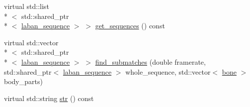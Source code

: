 \begin{DoxyCompactItemize}
\item 
virtual std\-::list\\*
$<$ std\-::shared\-\_\-ptr\\*
$<$ \hyperlink{classmae_1_1fl_1_1laban_1_1laban__sequence}{laban\-\_\-sequence} $>$ $>$ \hyperlink{classmae_1_1fl_1_1laban_1_1decision__forest_a126d3adc28394e6c59e0241236c9cabe}{get\-\_\-sequences} () const 
\item 
virtual std\-::vector\\*
$<$ std\-::shared\-\_\-ptr\\*
$<$ \hyperlink{classmae_1_1fl_1_1laban_1_1laban__sequence}{laban\-\_\-sequence} $>$ $>$ \hyperlink{classmae_1_1fl_1_1laban_1_1decision__forest_adee0c63e7526109a3351d16a156ca024}{find\-\_\-submatches} (double framerate, std\-::shared\-\_\-ptr$<$ \hyperlink{classmae_1_1fl_1_1laban_1_1laban__sequence}{laban\-\_\-sequence} $>$ whole\-\_\-sequence, std\-::vector$<$ \hyperlink{classmae_1_1bone}{bone} $>$ body\-\_\-parts)
\item 
virtual std\-::string \hyperlink{classmae_1_1fl_1_1laban_1_1decision__forest_a94003980df791a1d1818f8aadf547cfb}{str} () const 
\end{DoxyCompactItemize}



